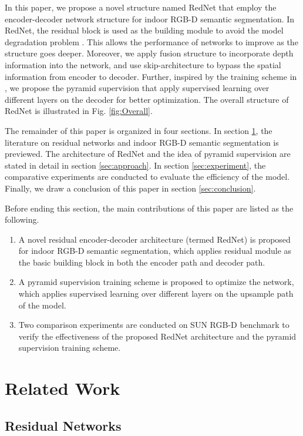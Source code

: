 \documentclass[runningheads]{llncs}
\begin{document}
In this paper, we propose a novel structure named RedNet that employ the encoder-decoder network structure for indoor RGB-D semantic segmentation. In RedNet, the residual block is used as the building module to avoid the model degradation problem \cite{he2016deep}. This allows the performance of networks to improve as the structure goes deeper. Moreover, we apply fusion structure to incorporate depth information into the network, and use skip-architecture to bypass the spatial information from encoder to decoder. Further, inspired by the training scheme in \cite{szegedy2015going}, we propose the pyramid supervision that apply supervised learning over different layers on the decoder for better optimization. The overall structure of RedNet is illustrated in Fig. \ref{fig:Overall}.

The remainder of this paper is organized in four sections. In section \ref{sec:relatedwork}, the literature on residual networks and indoor RGB-D semantic segmentation is previewed. The architecture of RedNet and the idea of pyramid supervision are stated in detail in section \ref{sec:approach}. In section \ref{sec:experiment}, the comparative experiments are conducted to evaluate the efficiency of the model. Finally, we draw a conclusion of this paper in section \ref{sec:conclusion}.

Before ending this section, the main contributions of this paper are listed as the following.
\begin{enumerate}
    \item[1.] A novel residual encoder-decoder architecture (termed RedNet) is proposed for indoor RGB-D semantic segmentation, which applies residual module as the basic building block in both the encoder path and decoder path.
    \item[2.] A pyramid supervision training scheme is proposed to optimize the network, which applies supervised learning over different layers on the upsample path of the model.
    \item[3.] Two comparison experiments are conducted on SUN RGB-D benchmark to verify the effectiveness of the proposed RedNet architecture and the pyramid supervision training scheme.
\end{enumerate}


\section{Related Work} \label{sec:relatedwork}

\subsection{Residual Networks}
\end{document}
